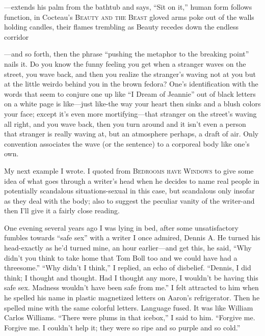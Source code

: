 \documentclass[
]{memoir}
\begin{document}
---extends his palm from the bathtub and says, ``Sit on it,'' human form
follows function, in Cocteau's \textsc{Beauty and the Beast} gloved arms
poke out of the walls holding candles, their flames trembling as Beauty
recedes down the endless corridor

---and so forth, then the phrase ``pushing the metaphor to the breaking
point'' nails it. Do you know the funny feeling you get when a stranger
waves on the street, you wave back, and then you realize the stranger's
waving not at you but at the little weirdo behind you in the brown
fedora? One's identification with the words that seem to conjure one up
like ``I Dream of Jeannie'' out of black letters on a white page is
like---just like-the way your heart then sinks and a blush colors your
face; except it's even more mortifying---that stranger on the street's
waving all right, and you wave back, then you turn around and it isn't
even a person that stranger is really waving at, but an atmosphere
perhaps, a draft of air. Only convention associates the wave (or the
sentence) to a corporeal body like one's own.

My next example I wrote. I quoted from \textsc{Bedrooms have Windows} to
give some idea of what goes through a writer's head when he decides to
name real people in potentially scandalous situations-sexual in this
case, but scandalous only insofar as they deal with the body; also to
suggest the peculiar vanity of the writer-and then I'll give it a fairly
close reading.

One evening several years ago I was lying in bed, after some
unsatisfactory fumbles towards ``safe sex'' with a writer I once
admired, Dennis A. He turned his head-exactly as he'd turned mine, an
hour earlier---and get this, he said, ``Why didn't you think to take
home that Tom Boll too and we could have had a threesome.'' ``Why didn't
I think,'' I replied, an echo of disbelief. ``Dennis, I did think; I
thought and thought. Had I thought any more, I wouldn't be having this
safe sex. Madness wouldn't have been safe from me.'' I felt attracted to
him when he spelled his name in plastic magnetized letters on Aaron's
refrigerator. Then he spelled mine with the same colorful letters.
Language fused. It was like William Carlos Williams. ``There were plums
in that icebox,'' I said to him. ``Forgive me. Forgive me. I couldn't
help it; they were so ripe and so purple and so cold.''
\end{document}
